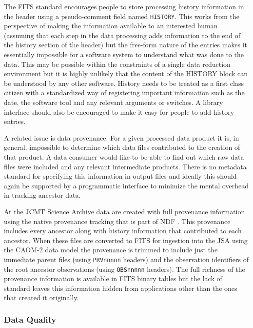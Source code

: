 \documentclass[final,authoryear,5p,times,twocolumn]{elsarticle}
\begin{document}
The FITS standard encourages people to store processing history
information in the header using a pseudo-comment field named
\texttt{HISTORY}. This works from the perspective of making the information
available to an interested human (assuming that each step in the data
processing adds information to the end of the history section of the
header) but the free-form nature of the entries makes it essentially
impossible for a software system to understand what was done to the
data. This may be possible within the constraints of a single data
reduction environment but it is highly unlikely that the content of
the HISTORY block can be understood by any other software. History
needs to be treated as a first class citizen with a standardized way
of registering important information such as the date, the software
tool and any relevant arguments or switches. A library interface
should also be encouraged to make it easy for people to add history
entries.


A related issue is data provenance. For a given processed data product
it is, in general, impossible to determine which data files
contributed to the creation of that product. A data consumer
would like to be able to find out which
raw data files were included and any relevant intermediate
products. There is no metadata standard for specifying this
information in output files and ideally this should again be supported
by a programmatic interface to minimize the mental overhead in
tracking ancestor data.

At the JCMT Science Archive \citep{2008ASPC..394..135G} data are
created with full provenance information using the native provenance
tracking that is part of NDF \citep{2009ASPC..411..418J}. This
provenance includes every ancestor along with history information that
contributed to each ancestor. When these files are converted to FITS
for ingestion into the JSA using the CAOM-2 data model
\citep{2013ASPC..475..159R} the provenance is trimmed to include
just the immediate parent files (using \texttt{PRVnnnnn} headers)
and the observation identifiers of the root ancestor observations
(using \texttt{OBSnnnnn} headers). The full richness of the provenance
information is available in FITS binary tables but the lack of standard
leaves this information hidden from applications other than the ones
that created it originally.

\subsubsection{Data Quality}
\end{document}
